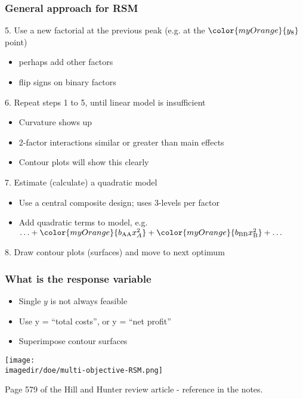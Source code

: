 \begin{frame}\frametitle{General approach for RSM}

	5. Use a new factorial at the previous peak (e.g. at the ${\color{myOrange}{y_8}}$ point)
	\begin{itemize}
		\item	perhaps add other factors
		\item	flip signs on binary factors
	\end{itemize}
	6. Repeat steps 1 to 5, until linear model is insufficient
	\begin{itemize}
		\item	Curvature shows up
		\item	2-factor interactions similar or greater than main effects
		\item	Contour plots will show this clearly
	\end{itemize}
	7. Estimate (calculate) a quadratic model
	\begin{itemize}
		\item	Use a central composite design; uses 3-levels per factor
		\item	Add quadratic terms to model, e.g. $\ldots + {\color{myOrange}{b_\text{AA}x_A^2}} + {\color{myOrange}{b_\text{BB}x_\text{B}^2}} + \ldots$
	\end{itemize}
	8. Draw contour plots (surfaces) and move to next optimum
\end{frame}

\begin{frame}\frametitle{What is the response variable}
	\begin{itemize}
		\item	Single $y$ is not always feasible
		\item	Use y = ``total costs'', or y = ``net profit''
		\item	Superimpose contour surfaces
	\end{itemize}
	\begin{center}
		\texttt{[image: \\imagedir/doe/multi-objective-RSM.png]}
	\end{center}
	Page 579 of the Hill and Hunter review article - reference in the notes.
\end{frame}

